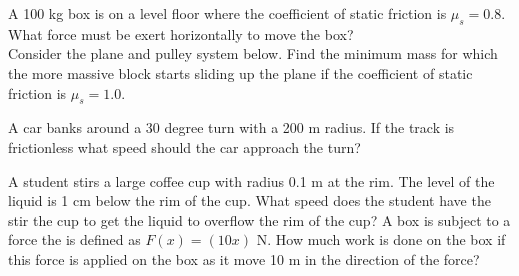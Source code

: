 \documentclass[12pt]{article}
\begin{document}
\noindent A 100 kg box is on a level floor where the coefficient of static friction is $\mu_s = 0.8$.  What force must be exert horizontally to move the box? \\
\newpage
\noindent Consider the plane and pulley system below.   Find the minimum mass for which the more massive block starts sliding up the plane if the coefficient of static friction is $\mu_s = 1.0$. 

\resizebox{7cm}{!}{}

\newpage
\noindent A car banks around a 30 degree turn with a 200 m radius. If the track is frictionless what speed should the car approach the turn?

\newpage
\noindent A student stirs a large coffee cup with radius 0.1 m at the rim.  The level of the liquid is 1 cm below the rim of the cup.  What speed does the student have the stir the cup to get the liquid to overflow the rim of the cup?
\newpage
\noindent A box is subject to a force the is defined as $F(x) = (10 x)$ N. How much work is done on the box if this force is applied on the box as it move 10 m in the direction of the force? 
\end{document}
